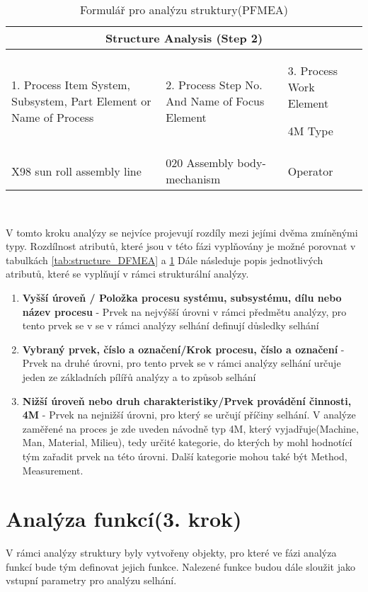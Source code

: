 \begin{center}
\begin{table}[h]
	\centering
	\caption{Formulář pro analýzu struktury(PFMEA) }
	\label{tab:structure_PFMEA}
\begin{tabular}{ |p{4cm}|p{3cm}|p{3cm}|  }
 \hline
 \multicolumn{3}{|c|}{Structure Analysis (Step 2)} \\
 \hline
1. Process Item
System, Subsystem, Part Element or Name of Process
& 2. Process Step
No. And Name of Focus Element
&3. Process Work Element

4M Type\\
 \hline
X98 sun roll assembly line   & 020 Assembly body-mechanism   &Operator\\


 \hline
\end{tabular}\  
\end{table}
\end{center}

V tomto kroku analýzy se nejvíce projevují rozdíly mezi jejími dvěma zmíněnými typy. Rozdílnost atributů, které jsou v této fázi vyplňovány je možné porovnat v tabulkách \ref{tab:structure_DFMEA} a  \ref{tab:structure_PFMEA} 
Dále následuje popis jednotlivých atributů, které se vyplňují v rámci strukturální analýzy. 

\begin{enumerate}
	\item \textbf{Vyšší úroveň / Položka procesu systému, subsystému, dílu nebo název procesu} - Prvek na nejvýšší úrovni v rámci předmětu analýzy, pro tento prvek se v se v rámci analýzy selhání definují důsledky selhání
	\item \textbf{Vybraný prvek, číslo a označení/Krok procesu, číslo a označení} - Prvek na druhé úrovni, pro tento prvek se v rámci analýzy selhání určuje jeden ze základních pílířů analýzy a to způsob selhání
	\item \textbf{Nižší úroveň nebo druh charakteristiky/Prvek provádění činnosti, 4M} - Prvek na nejnižší úrovni, pro který se určují příčiny selhání. V analýze zaměřené na proces je zde uveden návodně typ 4M, který vyjadřuje(Machine, Man, Material, Milieu), tedy určité kategorie, do kterých by mohl hodnotící tým zařadit prvek na této úrovni. Další kategorie mohou také být Method, Measurement.  
\end{enumerate}

\section{Analýza funkcí(3. krok)}
\label{sec:FMEA_postup_3}
V rámci analýzy struktury byly vytvořeny objekty, pro které ve fázi analýza funkcí bude tým definovat jejich funkce. Nalezené funkce budou dále sloužit jako vstupní parametry pro analýzu selhání. 

